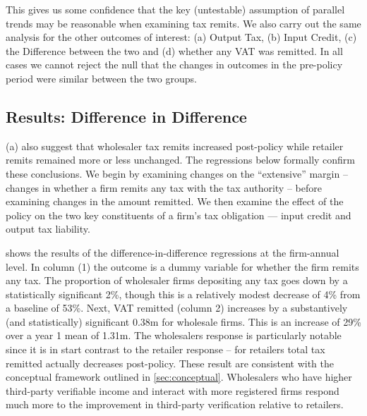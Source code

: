 This gives us some confidence that the key (untestable) assumption of parallel trends may be reasonable when examining tax remits. We also carry out the same analysis for the other outcomes of interest: (a) Output Tax, (b) Input Credit, (c) the Difference between the two and (d) whether any VAT was remitted. In all cases we cannot reject the null that the changes in outcomes in the pre-policy period were similar between the two groups.

\subsection{Results: Difference in Difference}
\label{subsec:diffindiff}
(a) also suggest that wholesaler tax remits increased post-policy while retailer remits remained more or less unchanged. The regressions below formally confirm these conclusions. We begin by examining changes on the ``extensive'' margin -- changes in whether a firm remits any tax with the tax authority -- before examining changes in the amount remitted. We then examine the effect of the policy on the two key constituents of a firm's tax obligation --- input credit and output tax liability.

 shows the results of the difference-in-difference regressions at the firm-annual level. In column (1) the outcome is a dummy variable for whether the firm remits any tax. The proportion of wholesaler firms depositing any tax goes down by a statistically significant 2\%, though this is a relatively modest decrease of 4\% from a baseline of 53\%. Next, VAT remitted (column 2) increases by a substantively (and statistically) significant \rupee 0.38m for wholesale firms. This is an increase of 29\% over a year 1 mean of \rupee 1.31m. The wholesalers response is particularly notable since it is in start contrast to the retailer response -- for retailers total tax remitted actually decreases post-policy. These result are consistent with the conceptual framework outlined in \cref{sec:conceptual}. Wholesalers who have higher third-party verifiable income and interact with more registered firms respond much more to the improvement in third-party verification relative to retailers.

